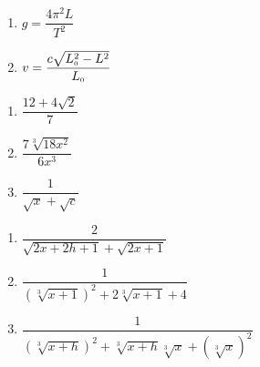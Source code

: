\documentclass{ximera}
\begin{document}
\begin{multicols}{2}
\begin{enumerate}
\setcounter{enumi}{\value{HW}}


\item $g = \dfrac{4 \pi^2 L}{T^2}$ 

\item $v = \dfrac{c \sqrt{L_{\text{\tiny $0$}}^2 - L^2}}{L_{\text{\tiny $0$}}}$  

\setcounter{HW}{\value{enumi}}
\end{enumerate}
\end{multicols}




\begin{multicols}{3}
\begin{enumerate}
\setcounter{enumi}{\value{HW}}


\item   $\dfrac{12 + 4\sqrt{2}}{7}$  

\item  $\dfrac{7 \sqrt[3]{18x^2}}{6x^3}$

\item   $\dfrac{1}{\sqrt{x}+ \sqrt{c}}$ 

\setcounter{HW}{\value{enumi}}
\end{enumerate}
\end{multicols}

\enlargethispage{1in}

\begin{multicols}{3}
\begin{enumerate}
\setcounter{enumi}{\value{HW}}


\item  $\dfrac{2}{\sqrt{2x+2h+1} + \sqrt{2x+1}}$                                  

\item  $\dfrac{1}{(\sqrt[3]{x+1})^2 + 2\sqrt[3]{x+1} + 4}$                                    

\item  $\dfrac{1}{(\sqrt[3]{x+h})^2 + \sqrt[3]{x+h}\sqrt[3]{x} + (\sqrt[3]{x})^2}$

\setcounter{HW}{\value{enumi}}
\end{enumerate}
\end{multicols}
\end{document}
